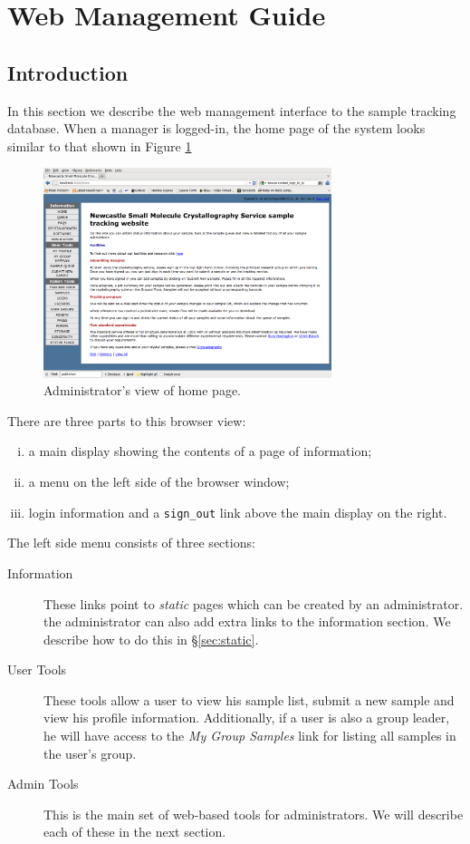 \documentclass[12pt]{article}
\begin{document}
\section{Web Management Guide}
\subsection{Introduction}
In this section we describe the web management interface to the
sample tracking database. When a manager is logged-in, the home page of
the system looks similar to that shown in Figure \ref{fig:homepage}

\begin{figure}[!h]
\begin{center}
\includegraphics[width=0.75\textwidth]{homepage}
\caption{Administrator's view of home page.\label{fig:homepage}}
\end{center}
\end{figure}

There are three parts to this browser view:
\begin{enumerate}[(i)]
\item
a main display showing the contents of a page of information;
\item
a menu on the left side of the browser window;
\item
login information and a \verb=sign_out= link above the main display on
the right.
\end{enumerate}

The left side menu consists of three sections:
\begin{description}
\item[Information]
These links point to \emph{static} pages which can be created by an
administrator. the administrator can also add extra links to the
information section. We describe how to do this in \S\ref{sec:static}.
\item[User Tools]
These tools allow a user to view his sample list, submit a new sample
and view his profile information. Additionally, if a user is also a group
leader, he will have access to the \emph{My Group Samples} link for listing
all samples in the user's group.
\item[Admin Tools]
This is the main set of web-based tools for administrators. We will
describe each of these in the next section.
\end{description}
\end{document}
